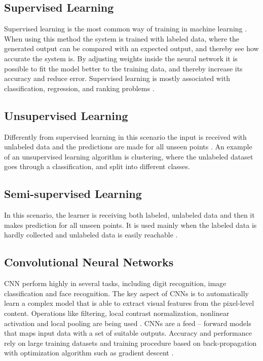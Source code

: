 \subsection{Supervised Learning}
Supervised learning is the most common way of training in machine learning \citep{LeCun2015}. When using this method the system is trained with labeled data, where the generated output can be compared with an expected output, and thereby see how accurate the system is. By adjusting weights inside the neural network it is possible to fit the model better to the training data, and thereby increase its accuracy and reduce error. \citep{LeCun2015} Supervised learning is mostly associated with classification, regression, and ranking problems \citep{Mehryar2012}.

\subsection{Unsupervised Learning}
Differently from supervised learning in this scenario the input is received with unlabeled data and the predictions are made for all unseen points \citep{Mehryar2012}. An example of an unsupervised learning algorithm is clustering, where the unlabeled dataset goes through a classification, and split into different classes. \citep{Goodfellow2016} 

\subsection{Semi-supervised Learning}
In this scenario, the learner is receiving both labeled, unlabeled data and then it makes prediction for all unseen points. It is used mainly when the labeled data is hardly collected and unlabeled data is easily reachable \citep{Mehryar2012}.

\subsection{Convolutional Neural Networks}
CNN perform highly in several tasks, including digit recognition, image classification and face recognition. The key aspect of CNNs is to automatically learn a complex model that is able to extract visual features from the pixel-level content. Operations like filtering, local contrast normalization, nonlinear activation and local pooling are being used \citep{Acquarelli2017}.
CNNs are a feed – forward models that maps input data with a set of suitable outputs. 
Accuracy and performance rely on large training datasets and training procedure based on back-propagation with optimization algorithm such as gradient descent \citep{Acquarelli2017}.

